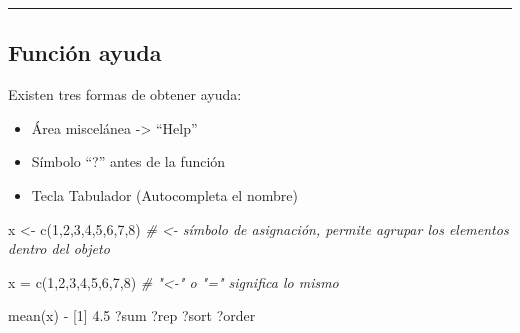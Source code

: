 \documentclass[
]{book}
\newenvironment{Shaded}{\begin{snugshade}}{\end{snugshade}}
\newcommand{\CommentTok}[1]{\textcolor[rgb]{0.56,0.35,0.01}{\textit{#1}}}
\newcommand{\DecValTok}[1]{\textcolor[rgb]{0.00,0.00,0.81}{#1}}
\newcommand{\FloatTok}[1]{\textcolor[rgb]{0.00,0.00,0.81}{#1}}
\newcommand{\FunctionTok}[1]{\textcolor[rgb]{0.00,0.00,0.00}{#1}}
\newcommand{\NormalTok}[1]{#1}
\newcommand{\OtherTok}[1]{\textcolor[rgb]{0.56,0.35,0.01}{#1}}
\newcommand{\SpecialCharTok}[1]{\textcolor[rgb]{0.00,0.00,0.00}{#1}}
\providecommand{\tightlist}{%
  \setlength{\itemsep}{0pt}\setlength{\parskip}{0pt}}
\begin{document}
\begin{center}\rule{0.5\linewidth}{0.5pt}\end{center}

\hypertarget{funciuxf3n-ayuda}{%
\subsection{Función ayuda}\label{funciuxf3n-ayuda}}

Existen tres formas de obtener ayuda:

\begin{itemize}
\tightlist
\item
  Área miscelánea -\textgreater{} ``Help''
\item
  Símbolo ``?'' antes de la función
\item
  Tecla Tabulador (Autocompleta el nombre)
\end{itemize}

\begin{Shaded}
\begin{Highlighting}[]
\NormalTok{x }\OtherTok{\textless{}{-}} \FunctionTok{c}\NormalTok{(}\DecValTok{1}\NormalTok{,}\DecValTok{2}\NormalTok{,}\DecValTok{3}\NormalTok{,}\DecValTok{4}\NormalTok{,}\DecValTok{5}\NormalTok{,}\DecValTok{6}\NormalTok{,}\DecValTok{7}\NormalTok{,}\DecValTok{8}\NormalTok{) }\CommentTok{\# \textless{}{-} símbolo de asignación, permite agrupar los elementos dentro del objeto }
\end{Highlighting}
\end{Shaded}

\begin{Shaded}
\begin{Highlighting}[]
\NormalTok{x }\OtherTok{=} \FunctionTok{c}\NormalTok{(}\DecValTok{1}\NormalTok{,}\DecValTok{2}\NormalTok{,}\DecValTok{3}\NormalTok{,}\DecValTok{4}\NormalTok{,}\DecValTok{5}\NormalTok{,}\DecValTok{6}\NormalTok{,}\DecValTok{7}\NormalTok{,}\DecValTok{8}\NormalTok{) }\CommentTok{\# "\textless{}{-}" o "=" significa lo mismo}
\end{Highlighting}
\end{Shaded}

\begin{Shaded}
\begin{Highlighting}[]
\FunctionTok{mean}\NormalTok{(x)}
\SpecialCharTok{{-}}\NormalTok{ [}\DecValTok{1}\NormalTok{] }\FloatTok{4.5}
\NormalTok{?sum}
\NormalTok{?rep}
\NormalTok{?sort}
\NormalTok{?order}
\end{Highlighting}
\end{Shaded}
\end{document}
